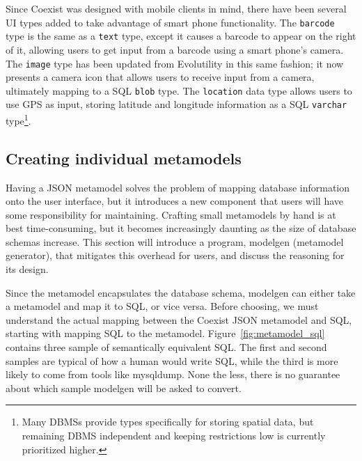 Since Coexist was designed with mobile clients in mind, there have been several
UI types added to take advantage of smart phone functionality. The
\texttt{barcode} type is the same as a \texttt{text} type, except it causes a
barcode to appear on the right of it, allowing users to get input from a barcode
using a smart phone's camera. The \texttt{image} type has been updated from
Evolutility in this same fashion; it now presents a camera icon that allows
users to receive input from a camera, ultimately mapping to a SQL \texttt{blob}
type. The \texttt{location} data type allows users to use GPS as input, storing
latitude and longitude information as a SQL \texttt{varchar} type\footnote{Many
DBMSs provide types specifically for storing spatial data, but remaining DBMS
independent and keeping restrictions low is currently prioritized higher.}. 





\newcommand{\sql}[1]{\texttt{$#1_{sql}$}}
\newcommand{\mm}[1]{\texttt{$#1_{mm}$}}
\subsection{Creating individual metamodels}  \label{sec:}

Having a JSON metamodel solves the problem of mapping database information onto
the user interface, but it introduces a new component that users will have some
responsibility for maintaining. Crafting small metamodels by hand is at best
time-consuming, but it becomes increasingly daunting as the size of database
schemas increase.  This section will introduce a program, modelgen (metamodel
generator), that mitigates this overhead for users, and discuss the reasoning
for its design.

Since the metamodel encapsulates the database schema, modelgen can either take
a metamodel and map it to SQL, or vice versa. Before choosing, we must
understand the actual mapping between the Coexist JSON metamodel and SQL,
starting with mapping SQL to the metamodel. Figure~\ref{fig:metamodel_sql}
contains three sample of semantically equivalent SQL. The first and second
samples are typical of how a human would write SQL, while the third is more
likely to come from tools like mysqldump. None the less, there is no guarantee
about which sample modelgen will be asked to convert.

